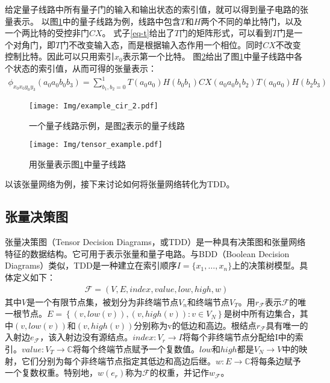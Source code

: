 给定量子线路中所有量子门的输入和输出状态的索引值，就可以得到量子电路的张量表示。
以图\ref{fig:example_cir_2}中的量子线路为例，线路中包含$T$和$H$两个不同的单比特门，以及一个两比特的受控非门$CX$。
式子\ref{eq-t}给出了$T$门的矩阵形式，可以看到$T$门是一个对角门，即$T$门不改变输入态，而是根据输入态作用一个相位。同时$CX$不改变控制比特。因此可以只用索引$x_0$表示第一个比特。
图\ref{fig:example_cir_map}给出了图\ref{fig:example_cir_2}中量子线路中各个状态的索引值，从而可得的张量表示：
\begin{align}
    \phi_{x_0x_0y_0y_3}\left(a_0a_0b_0b_3\right)=\sum_{b_1,b_2=0}^{1}T\left(a_0a_0\right)H\left(b_0b_1\right)CX\left(a_0a_0b_1b_2\right)T\left(a_0a_0\right)H\left(b_2b_3\right)
    \end{align}
\begin{figure}[!htbp]
    \centering
    \texttt{[image: Img/example\_cir\_2.pdf]}
    \caption{一个量子线路示例，是图\ref{fig:example_cir_map}表示的量子线路}   
    \label{fig:example_cir_2}
\end{figure}
\begin{figure}[!htbp]
    \centering
    \texttt{[image: Img/tensor\_example.pdf]}
    \caption{用张量表示图\ref{fig:example_cir_2}中量子线路}   
    \label{fig:example_cir_map}
\end{figure}
以该张量网络为例，接下来讨论如何将张量网络转化为TDD。
\subsection{张量决策图}
张量决策图（Tensor Decision Diagrams，或TDD）是一种具有决策图和张量网络特征的数据结构\citep{Hong_2022}。它可用于表示张量和量子电路。与BDD（Boolean Decision Diagrams）类似，TDD是一种建立在索引顺序$I=\{x_1,\ldots,x_n\}$上的决策树模型。具体定义如下：
\begin{align}
    \mathcal{F}=\left(V,E,index,value,low,high,w\right)
\end{align}
其中$V$是一个有限节点集，被划分为非终端节点$V_n$和终端节点$V_T$。用$r_{\mathcal{F}}$表示$\mathcal{F}$的唯一根节点。$E=\left\{\left(v,low\left(v\right)\right),\left(v,high\left(v\right)\right):v\in V_N\right\}$是树中所有边集合，其中$\left(v,low\left(v\right)\right)$和$\left(v,high\left(v\right)\right)$分别称为v的低边和高边。根结点$r_{\mathcal{F}}$具有唯一的入射边$e_{\mathcal{F}}$，该入射边没有源结点。$index:V_r\rightarrow I$将每个非终端节点分配给I中的索引。$value:V_T\rightarrow\mathbb{C}$将每个终端节点赋予一个复数值。$low$和$high$都是$V_N\rightarrow V$中的映射，它们分别为每个非终端节点指定其低边和高边后继。$w:E\rightarrow\mathbb{C}$将每条边赋予一个复数权重。特别地，$w\left(e_r\right)$称为$\mathcal{F}$的权重，并记作$w_{\mathcal{F}}$。 


